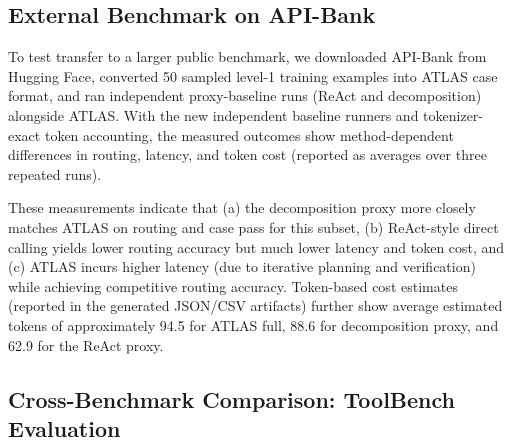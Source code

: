 \documentclass[conference]{IEEEtran}
\begin{document}
\subsection{External Benchmark on API-Bank}

To test transfer to a larger public benchmark, we downloaded API-Bank from Hugging Face, converted 50 sampled level-1 training examples into ATLAS case format, and ran independent proxy-baseline runs (ReAct and decomposition) alongside ATLAS. With the new independent baseline runners and tokenizer-exact token accounting, the measured outcomes show method-dependent differences in routing, latency, and token cost (reported as averages over three repeated runs).

\begin{table}[htbp]
\caption{API-Bank level-1 subset results on 50 converted cases (measured; 3 repeated runs). Avg latency reported in ms; token counts are tokenizer-based estimates.}
\centering
{}
\label{tab:apibank-results}
\end{table}

These measurements indicate that (a) the decomposition proxy more closely matches ATLAS on routing and case pass for this subset, (b) ReAct-style direct calling yields lower routing accuracy but much lower latency and token cost, and (c) ATLAS incurs higher latency (due to iterative planning and verification) while achieving competitive routing accuracy. Token-based cost estimates (reported in the generated JSON/CSV artifacts) further show average estimated tokens of approximately 94.5 for ATLAS full, 88.6 for decomposition proxy, and 62.9 for the ReAct proxy.

\subsection{Cross-Benchmark Comparison: ToolBench Evaluation}
\end{document}
